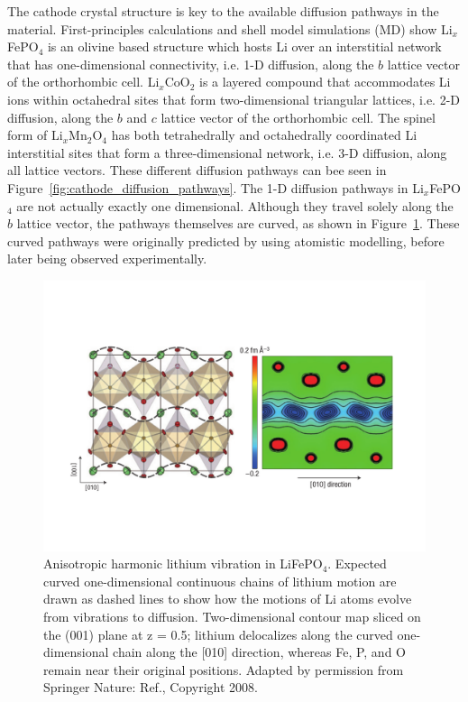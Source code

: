 \documentclass[../main.tex]{subfiles}
\begin{document}
The cathode crystal structure is key to the available diffusion pathways in the material. First-principles calculations \cite{Morgan2004,ouyang2004first} and shell model simulations (MD)\cite{islam2005atomic} show Li$_x$FePO$_4$ is an olivine based structure which hosts Li over an interstitial network that has one-dimensional connectivity, i.e. 1-D diffusion, along the $b$ lattice vector of the orthorhombic cell.\cite{amin2006anisotropy} Li$_x$CoO$_2$ is a layered compound that accommodates Li ions within octahedral sites that form two-dimensional triangular lattices, i.e. 2-D diffusion, along the $b$ and $c$ lattice vector of the orthorhombic cell. \cite{van2000lithium} The spinel form of Li$_x$Mn$_2$O$_4$ has both tetrahedrally and octahedrally coordinated Li interstitial sites that form a three-dimensional network, i.e. 3-D diffusion, along all lattice vectors. \cite{thackeray1997manganese,proell20123d} These different diffusion pathways can bee seen in Figure~\ref{fig:cathode_diffusion_pathways}. The 1-D diffusion pathways in Li$_x$FePO$_4$ are not actually exactly one dimensional. Although they travel solely along the $b$ lattice vector, the pathways themselves are curved, as shown in Figure~\ref{fig:curved_pathways}. These curved pathways were originally predicted by \citeauthor{islam2005atomic} using atomistic modelling,\cite{islam2005atomic} before later being observed experimentally. \cite{nishimura2008experimental}

\begin{figure}
    \centering
    \includegraphics[scale=0.5]{figures/curved_1D_paths.pdf}
    \caption{Anisotropic harmonic lithium vibration in LiFePO$_4$. Expected curved one-dimensional continuous chains of lithium motion are drawn as dashed lines to show how the motions of Li atoms evolve from vibrations to diffusion. Two-dimensional contour map sliced on the (001) plane at z = 0.5; lithium delocalizes along the curved one-dimensional chain along the [010] direction, whereas Fe, P, and O remain near their original positions.
    Adapted by permission from Springer Nature: Ref., Copyright 2008.}
    \label{fig:curved_pathways}
\end{figure}
\end{document}
